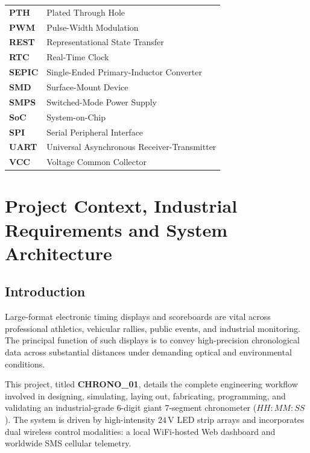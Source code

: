\documentclass[12pt,a4paper,oneside]{report}
\begin{document}
\begin{table}[H]
\begin{tabular}{ll}
\textbf{PTH} & Plated Through Hole \\
\textbf{PWM} & Pulse-Width Modulation \\
\textbf{REST} & Representational State Transfer \\
\textbf{RTC} & Real-Time Clock \\
\textbf{SEPIC} & Single-Ended Primary-Inductor Converter \\
\textbf{SMD} & Surface-Mount Device \\
\textbf{SMPS} & Switched-Mode Power Supply \\
\textbf{SoC} & System-on-Chip \\
\textbf{SPI} & Serial Peripheral Interface \\
\textbf{UART} & Universal Asynchronous Receiver-Transmitter \\
\textbf{VCC} & Voltage Common Collector \\
\bottomrule
\end{tabular}
\end{table}

\newpage
{}
\setcounter{page}{1}

\chapter{Project Context, Industrial Requirements and System Architecture}

\section{Introduction}
Large-format electronic timing displays and scoreboards are vital across professional athletics, vehicular rallies, public events, and industrial monitoring. The principal function of such displays is to convey high-precision chronological data across substantial distances under demanding optical and environmental conditions. 

This project, titled \textbf{CHRONO\_01}, details the complete engineering workflow involved in designing, simulating, laying out, fabricating, programming, and validating an industrial-grade 6-digit giant 7-segment chronometer ($HH:MM:SS$). The system is driven by high-intensity $24\,\text{V}$ LED strip arrays and incorporates dual wireless control modalities: a local WiFi-hosted Web dashboard and worldwide SMS cellular telemetry.
\end{document}
